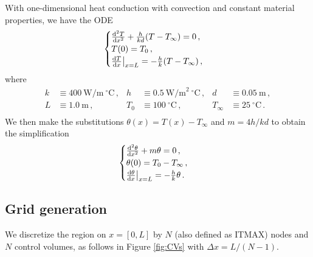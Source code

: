 \documentclass{article}
\begin{document}
With one-dimensional heat conduction with convection and constant material properties, we have the ODE
\begin{equation}
	\begin{cases}
		\dv{^2T}{x^2} + \frac{h}{kd} (T - T_\infty) = 0\,,\\
		T(0) = T_0\,,\\
		\dv{T}{x} \big|_{x = L} = - \frac{h}{k} (T - T_\infty)\,,
	\end{cases}
\end{equation}
where
\begin{align*}
	k & \equiv 400~\text{W/m}~^\circ\text{C}\,, & h & \equiv 0.5~\text{W/m}^2~^\circ\text{C}\,, & d & \equiv 0.05~\text{m}\,,\\
	L & \equiv 1.0~\text{m}\,, & T_0 & \equiv 100~^\circ\text{C}\,, & T_\infty & \equiv 25~^\circ\text{C}\,.\\ 
\end{align*}
We then make the substitutions $\theta(x) = T(x) - T_\infty$ and $m = 4h/kd$ to obtain the simplification
\begin{equation}
	\begin{cases}
		\dv{^2\theta}{x^2} + m \theta = 0\,,\\
		\theta(0) = T_0 - T_\infty\,,\\
		\dv{\theta}{x} \big|_{x = L} = - \frac{h}{k} \theta\,.
	\end{cases}
	\end{equation}
	
\subsection*{Grid generation}

We discretize the region on $x = [0, L]$ by $N$ (also defined as ITMAX) nodes and $N$ control volumes, as follows in Figure \ref{fig:CVs} with $\Delta x = L / (N - 1)$.
\end{document}
